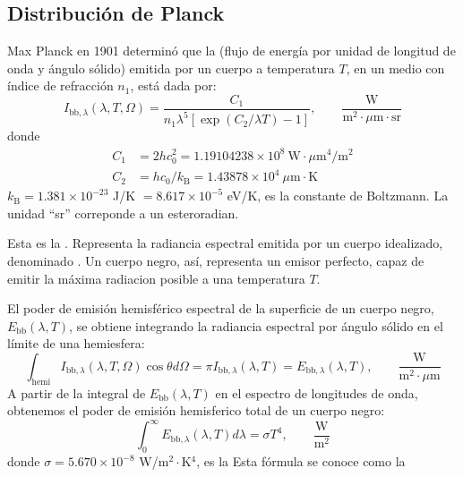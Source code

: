 \documentclass[letterpaper,10pt,english]{jupyterBook}
\begin{document}
\subsection{Distribución de Planck}
\label{\detokenize{6_RadiacionTermica/6_RadiacionTermica:distribucion-de-planck}}
\sphinxAtStartPar
Max Planck en 1901 determinó que la  (flujo de energía por unidad de longitud de onda y ángulo sólido) emitida por un cuerpo a temperatura \(T\), en un medio con índice de refracción \(n_1\), está dada por:
\label{equation:6_RadiacionTermica/6_RadiacionTermica:d382d0ba-7493-4c0c-8dfa-373d48b82072}\begin{equation}
I_{\mathrm{bb},\lambda}(\lambda,T,\Omega) = \frac{C_1}{n_1\lambda^5\left[\exp\left(C_2/\lambda T\right) - 1\right]},\quad\quad\frac{\mathrm{W}}{\mathrm{m}^2\cdot\mu\mathrm{m}\cdot\mathrm{sr}}
\end{equation}
\sphinxAtStartPar
donde
\begin{align*}
C_1 &= 2hc_0^2 = 1.19104238\times 10^8 ~\mathrm{W}\cdot\mu\mathrm{m}^4/\mathrm{m}^2 \\
C_2 &= hc_0/k_\mathrm{B} = 1.43878\times10^{4}~\mu\mathrm{m}\cdot\mathrm{K}
\end{align*}
\sphinxAtStartPar
\(k_\mathrm{B} = 1.381\times 10^{-23}\) J/K \(=8.617\times 10^{-5}\) eV/K, es la constante de Boltzmann. La unidad “sr” correponde a un esteroradian.

\sphinxAtStartPar
Esta es la . Representa la radiancia espectral emitida por un cuerpo idealizado, denominado . Un cuerpo negro, así, representa un emisor perfecto, capaz de emitir la máxima radiacion posible a una temperatura \(T\).

\sphinxAtStartPar
El poder de emisión hemisférico espectral de la superficie de un cuerpo negro, \(E_\mathrm{bb}(\lambda,T)\), se obtiene integrando la radiancia espectral por ángulo sólido en el límite de una hemiesfera:
\label{equation:6_RadiacionTermica/6_RadiacionTermica:876bc3cb-254b-4556-a824-304d8c8bef5f}\begin{equation}
\int_\mathrm{hemi} I_{\mathrm{bb},\lambda}(\lambda,T,\Omega)\cos\theta d\Omega = \pi I_{\mathrm{bb},\lambda}(\lambda,T) = E_{\mathrm{bb},\lambda}(\lambda,T),\quad\quad\frac{\mathrm{W}}{\mathrm{m}^2\cdot\mu\mathrm{m}}
\end{equation}
\sphinxAtStartPar
A partir de la integral de \(E_\mathrm{bb}(\lambda,T)\) en el espectro de longitudes de onda, obtenemos el poder de emisión hemisferico total de un cuerpo negro:
\label{equation:6_RadiacionTermica/6_RadiacionTermica:c2169311-dcad-4504-a95c-4356f4be9f68}\begin{equation}
\int_0^\infty E_{\mathrm{bb},\lambda}(\lambda,T) d\lambda = \sigma T^4,\quad\quad\frac{\mathrm{W}}{\mathrm{m}^2}
\end{equation}
\sphinxAtStartPar
donde \(\sigma = 5.670\times10^{-8}\) W/m\(^2\cdot\)K\(^4\), es la  Esta fórmula se conoce como la 
\end{document}

